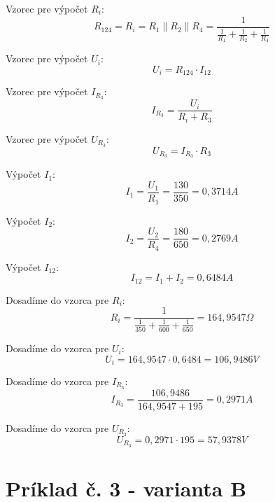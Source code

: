 \documentclass[a4paper,11pt,titlepage]{article}
\begin{document}
\vspace{5mm}

Vzorec pre výpočet $R_i$:
\[R_{124} = R_i = R_1 \parallel R_2 \parallel R_4 = \frac{1}{\frac{1}{R_1} + \frac{1}{R_2} + \frac{1}{R_4}}\]

\vspace{5mm}

Vzorec pre výpočet $U_i$:
\[U_i = R_{124} \cdot I_{12}\]

\vspace{5mm}

Vzorec pre výpočet $I_{R_3}$:
\[I_{R_3} = \frac{U_i}{R_i + R_3}\]

\vspace{5mm}

Vzorec pre výpočet $U_{R_3}$:
\[U_{R_3} = I_{R_3} \cdot R_3\]

\vspace{5mm}

Výpočet $I_1$:
\[I_1 = \frac{U_1}{R_1} = \frac{130}{350} = 0,3714A\]

\vspace{5mm}

Výpočet $I_2$:
\[I_2 = \frac{U_2}{R_4} = \frac{180}{650} = 0,2769A\]

\vspace{5mm}

Výpočet $I_{12}$:
\[I_{12} = I_1 + I_2 = 0,6484A\]

\vspace{5mm}

Dosadíme do vzorca pre $R_i$:
\[R_i = \frac{1}{\frac{1}{350} + \frac{1}{600} + \frac{1}{650}} = 164,9547 \Omega\]

\vspace{5mm}

Dosadíme do vzorca pre $U_i$:
\[U_i = 164,9547 \cdot 0,6484 = 106,9486V\]

\vspace{5mm}

Dosadíme do vzorca pre $I_{R_3}$:
\[I_{R_3} = \frac{106,9486}{164,9547 + 195} = 0,2971A\]

\vspace{5mm}

Dosadíme do vzorca pre $U_{R_3}$:
\[U_{R_3} = 0,2971 \cdot 195 = 57,9378V\]

\newpage

\section{Príklad č. 3 - varianta B}
\end{document}
